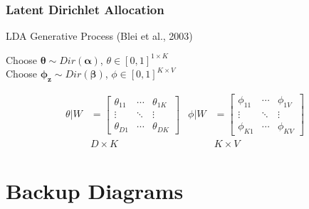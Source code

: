 \documentclass{beamer}
\begin{document}
    \begin{frame}
        \frametitle{Latent Dirichlet Allocation}
        LDA Generative Process (Blei et al., 2003)
        \newline

        \begin{algorithm}[H]

            Choose $\mathbf{\theta} \sim Dir(\mathbf{\alpha})$, $\theta \in [0, 1]^{1 \times K}$ \\
            Choose $\mathbf{\phi_{z}} \sim Dir(\mathbf{\beta})$, $\phi \in [0, 1]^{K \times V}$ \\
        \end{algorithm}

        \begin{equation*}
            \begin{array}{ccccc}
                \theta | W &=
                \begin{bmatrix}
                    \theta_{11} & \cdots & \theta_{1K} \\
                    \vdots &\ddots & \vdots \\
                    \theta_{D1} & \cdots & \theta_{DK}
                \end{bmatrix} &

                \phi | W &=
                \begin{bmatrix}
                    \phi_{11} & \cdots & \phi_{1V} \\
                    \vdots &\ddots & \vdots \\
                    \phi_{K1} & \cdots & \phi_{KV}
                \end{bmatrix} \\
                & \text{$D \times K$} & & \text{$K \times V$}
            \end{array}
        \end{equation*}
    \end{frame}

    \section{Backup Diagrams}
\end{document}
